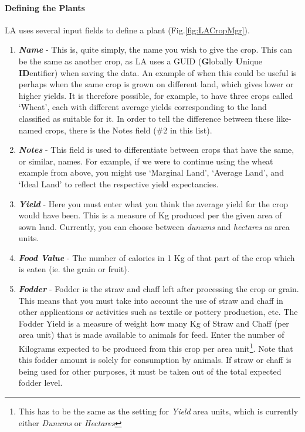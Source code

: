 \paragraph{Defining the Plants}
LA uses several input fields to define a plant (Fig.\ref{fig:LACropMgr}). %
\begin{enumerate}
	\item \textbf{\textit{Name}} - This is, quite simply, the name you wish to give the crop. This can be the same as another crop, as LA uses a GUID (\textbf{G}lobally \textbf{U}nique \textbf{ID}entifier) when saving the data. An example of when this could be useful is perhaps when the same crop is grown on different land, which gives lower or higher yields. It is therefore possible, for example, to have three crops called `Wheat', each with different average yields corresponding to the land classified as suitable for it. In order to tell the difference between these like-named crops, there is the Notes field (\#2 in this list). 
	\item \textbf{\textit{Notes}} - This field is used to differentiate between crops that have the same, or similar, names. For example, if we were to continue using the wheat example from above, you might use `Marginal Land', `Average Land', and `Ideal Land' to reflect the respective yield expectancies. %
	\item \textbf{\textit{Yield}} - Here you must enter what you think %
	the average yield for the crop would have been. This is a measure of Kg produced per the given area of sown land. Currently, you can choose between \textit{dunums} and \textit{hectares} as area units. 
	\item \textbf{\textit{Food Value}} - The number of calories in 1 Kg of that part of the crop which is eaten (ie. the grain or fruit). 
	\item \textbf{\textit{Fodder}} - Fodder %
	is the straw and chaff left after processing the crop or grain. %
	This means that you must take into account the use of straw and chaff in other applications or activities such as textile or pottery production, etc. The Fodder Yield is a measure of weight how many Kg of Straw and Chaff (per area unit) that is made available to animals for feed. Enter the number of Kilograms expected to be produced from this crop per area unit\footnote{This has to be the same as the setting for \textit{Yield} area units, which is currently either \textit{Dunums} or \textit{Hectares}}. Note that this fodder amount is solely for consumption by animals. If straw or chaff is being used for other purposes, it must be taken out of the total expected fodder level. %

\end{enumerate}
